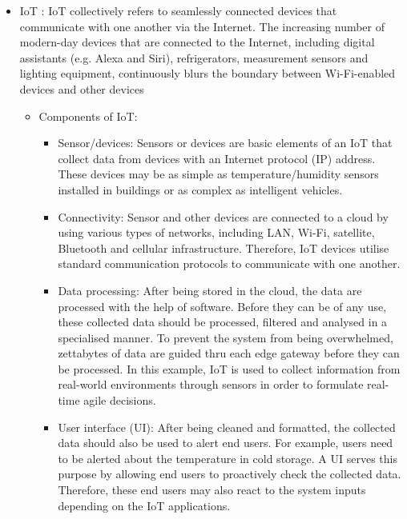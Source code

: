 \documentclass{article}
\begin{document}
\begin{itemize}
\begin{itemize}
        \end{itemize}

    \item IoT : IoT collectively refers to seamlessly connected devices that communicate with one another via the Internet. The increasing number of modern-day devices that are connected to the Internet, including digital assistants (e.g. Alexa and Siri), refrigerators, measurement sensors and lighting equipment, continuously blurs the boundary between Wi-Fi-enabled devices and other devices 
        \begin{itemize}
            \item Components of IoT: 
            \begin{itemize}
                \item Sensor/devices: Sensors or devices are basic elements of an IoT that collect data from devices with an Internet protocol (IP) address. These devices may be as simple as temperature/humidity sensors installed in buildings or as complex as intelligent vehicles.

                \item Connectivity: Sensor and other devices are connected to a cloud by using various types of networks, including LAN, Wi-Fi, satellite, Bluetooth and cellular infrastructure. Therefore, IoT devices utilise standard communication protocols to communicate with one another.

                \item Data processing: After being stored in the cloud, the data are processed with the help of software. Before they can be of any use, these collected data should be processed, filtered and analysed in a specialised manner. To prevent the system from being overwhelmed, zettabytes of data are guided thru each edge gateway before they can be processed. In this example, IoT is used to collect information from real-world environments through sensors in order to formulate real-time agile decisions.

                \item User interface (UI): After being cleaned and formatted, the collected data should also be used to alert end users. For example, users need to be alerted about the temperature in cold storage. A UI serves this purpose by allowing end users to proactively check the collected data. Therefore, these end users may also react to the system inputs depending on the IoT applications.
            \end{itemize}


\end{itemize}
\end{itemize}
\end{document}
